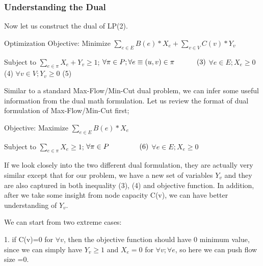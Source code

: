 \documentclass{sig-alternate}
\begin{document}
\subsubsection{Understanding the Dual}
Now let us construct the dual of LP(2).\newline

Optimization Objective:
\newline
Minimize $\sum \limits_{e \in E} B(e)* X_e +\sum \limits_{v \in V} C(v)*Y_v $  
\newline

Subject to
\newline
$\sum \limits_{e\in \pi} X_e + Y_v \geq 1$;  \hspace{15 mm} $\forall \pi \in P; \forall e\equiv(u,v)\in \pi  \hspace{11 mm}(3) $ \newline
$\forall e \in E; X_e\geq 0$  \hspace{60 mm} (4)   \newline
$\forall v \in V; Y_v \geq 0$ \hspace{60 mm} (5)  

Similar to a standard Max-Flow/Min-Cut dual problem, we can infer some useful information from the dual math formulation. Let us review the format of dual formulation of Max-Flow/Min-Cut first;

Objective: \newline
Maximize $\sum \limits_{e \in E} B(e)* X_e $  
\newline

Subject to
\newline
$\sum \limits_{e\in \pi} X_e  \geq 1$;  \hspace{35 mm} $\forall \pi \in P\hspace{15 mm}(6)$\newline
$\forall e \in E; X_e\geq 0$\newline

If we look closely into the two different dual formulation, they are actually very similar except that for our problem, we have a new set of variables $Y_v$ and they are also captured in both inequality (3), (4) and objective function. In addition, after we take some insight from node capacity C(v), we can have better understanding of $Y_v$. 
 
We can start from two extreme cases: 

1. if C(v)=0 for $\forall v$, then the objective function should have 0 minimum value, since we can simply have $Y_v\geq 1$ and $X_e=0$ for $\forall v;\forall  e$, so here we can push flow size =0.
 
\end{document}
